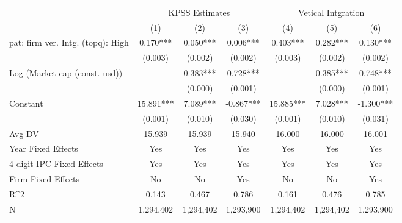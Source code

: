 {
\def\sym#1{\ifmmode^{#1}\else\(^{#1}\)\fi}
\begin{tabular}{l*{6}{c}}
\hline\hline
                    &\multicolumn{3}{c}{KPSS Estimates}             &\multicolumn{3}{c}{Vetical Intgration }        \\\cmidrule(lr){2-4}\cmidrule(lr){5-7}
                    &\multicolumn{1}{c}{(1)}   &\multicolumn{1}{c}{(2)}   &\multicolumn{1}{c}{(3)}   &\multicolumn{1}{c}{(4)}   &\multicolumn{1}{c}{(5)}   &\multicolumn{1}{c}{(6)}   \\
\hline
pat: firm ver. Intg. (topq): High&       0.170***&       0.050***&       0.006***&       0.403***&       0.282***&       0.130***\\
                    &     (0.003)   &     (0.002)   &     (0.002)   &     (0.003)   &     (0.002)   &     (0.002)   \\
Log (Market cap (const. usd))&               &       0.383***&       0.728***&               &       0.385***&       0.748***\\
                    &               &     (0.000)   &     (0.001)   &               &     (0.000)   &     (0.001)   \\
Constant            &      15.891***&       7.089***&      -0.867***&      15.885***&       7.028***&      -1.300***\\
                    &     (0.001)   &     (0.010)   &     (0.030)   &     (0.001)   &     (0.010)   &     (0.031)   \\
\hline
Avg DV              &      15.939   &      15.939   &      15.940   &      16.000   &      16.000   &      16.001   \\
Year Fixed Effects  &         Yes   &         Yes   &         Yes   &         Yes   &         Yes   &         Yes   \\
4-digit IPC Fixed Effects&         Yes   &         Yes   &         Yes   &         Yes   &         Yes   &         Yes   \\
Firm Fixed Effects  &          No   &          No   &         Yes   &          No   &          No   &         Yes   \\
R^2                 &       0.143   &       0.467   &       0.786   &       0.161   &       0.476   &       0.785   \\
N                   &   1,294,402   &   1,294,402   &   1,293,900   &   1,294,402   &   1,294,402   &   1,293,900   \\
\hline\hline
\end{tabular}
}
